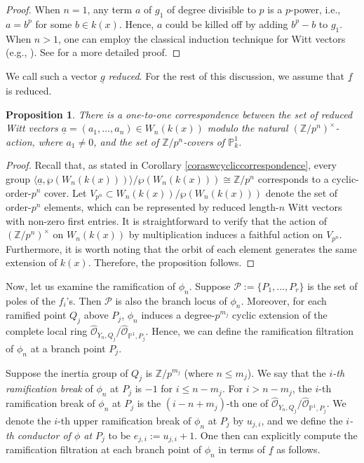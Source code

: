 \documentclass{compositio}
\newtheorem{proposition}[theorem]{Proposition}
\theoremstyle{remark}
\theoremstyle{remark}
\begin{document}
\begin{proof}
    When $n=1$, any term $a$ of $g_1$ of degree divisible to $p$ is a $p$-power, i.e., $a=b^p$ for some $b \in k(x)$. Hence, $a$ could be killed off by adding $b^p-b$ to $g_1$. When $n>1$, one can employ the classical induction technique for Witt vectors (e.g., \cite[\S 26, Addendum]{MR2371763}). See \cite[Lemma A.2.3]{MR3714509} for a more detailed proof.
\end{proof}

We call such a vector $\underline{g}$ \textit{reduced}. For the rest of this discussion, we assume that $\underline{f}$ is reduced. 

\begin{proposition}
\label{prop1to1ASW}
    There is a one-to-one correspondence between the set of reduced Witt vectors $\underline{a}=(a_1, \ldots, a_n) \in W_n(k(x))$ modulo the natural $(\mathbb{Z}/p^n)^{\times}$-action, where $a_1 \neq 0$, and the set of $\mathbb{Z}/p^n$-covers of $\mathbb{P}^1_k$.
\end{proposition}

\begin{proof}
Recall that, as stated in Corollary \ref{coraswcycliccorrespondence}, every group $\langle \underline{a},\wp(W_n(k(x)))\rangle/ \wp(W_n(k(x))) \cong \mathbb{Z}/p^n$ corresponds to a cyclic-order-$p^n$ cover. Let $V_{p^n} \subset W_n(k(x))/\wp(W_n(k(x)))$ denote the set of order-$p^n$ elements, which can be represented by reduced length-$n$ Witt vectors with non-zero first entries. It is straightforward to verify that the action of $(\mathbb{Z}/p^n)^{\times}$ on $W_n(k(x))$ by multiplication induces a faithful action on $V_{p^n}$. Furthermore, it is worth noting that the orbit of each element generates the same extension of $k(x)$. Therefore, the proposition follows.
\end{proof}



Now, let us examine the ramification of $\phi_n$. Suppose $\mathscr{P}:= \{P_1, \ldots, P_r\}$ is the set of poles of the $f_i$'s. Then $\mathscr{P}$ is also the branch locus of $\phi_n$. Moreover, for each ramified point $Q_j$ above $P_j$, $\phi_n$ induces a degree-$p^{m_j}$ cyclic extension of the complete local ring $\hat{\mathcal{O}}_{Y_n,Q_j}/\hat{\mathcal{O}}_{\mathbb{P}^1,P_j}$. Hence, we can define the ramification filtration of $\phi_n$ at a branch point $P_j$.

Suppose the inertia group of $Q_j$ is $\mathbb{Z}/p^{m_j}$ (where $n\le m_j$). We say that the \textit{$i$-th ramification break} of $\phi_n$ at $P_j$ is $-1$ for $i \le n-m_j$. For $i > n-m_j$, the $i$-th ramification break of $\phi_n$ at $P_j$ is the $(i-n+m_j)$-th one of $\hat{\mathcal{O}}_{Y_n,Q_j}/\hat{\mathcal{O}}_{\mathbb{P}^1,P_j}$. We denote the $i$-th upper ramification break of $\phi_n$ at $P_j$ by $u_{j,i}$, and we define the \textit{$i$-th conductor of $\phi$ at $P_j$} to be $e_{j,i}:=u_{j,i}+1$. One then can explicitly compute the ramification filtration at each branch point of $\phi_n$ in terms of $\underline{f}$ as follows.
\end{document}
